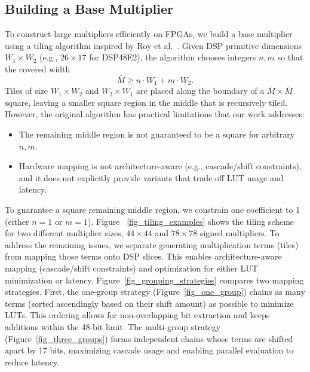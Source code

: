 \subsection{Building a Base Multiplier} \label{sec_build_base_mult}


To construct large multipliers efficiently on FPGAs, we build a base multiplier using a tiling algorithm inspired by Roy et al.~\cite{royTileMultiplicationEfficient2014}.
Given DSP primitive dimensions $W_1\times W_2$ (e.g., $26\times17$ for DSP48E2), the algorithm chooses integers $n,m$ so that the covered width
\[
\bar{M} \geq n \cdot  W_1  + m \cdot W_2 .
\]
Tiles of size $W_1\times W_2$ and $W_2\times W_1$ are placed along the boundary of a $\bar{M}\times\bar{M}$ square, leaving a smaller square region in the middle that is recursively tiled.
However, the original algorithm has practical limitations that our work addresses:
\begin{itemize}
    \item The remaining middle region is not guaranteed to be a square for arbitrary $n,m$.
    \item Hardware mapping is not architecture-aware (e.g., cascade/shift constraints), and it does not explicitly provide variants that trade off LUT usage and latency.
\end{itemize}

To guarantee a square remaining middle region, we constrain one coefficient to 1 (either $n=1$ or $m=1$).
Figure ~\ref{fig_tiling_examples} shows the tiling scheme for two different multiplier sizes, $44\times44$ and $78\times78$ signed multipliers.
To address the remaining issues, we separate generating multiplication terms (tiles) from mapping those terms onto DSP slices.
This enables architecture-aware mapping (cascade/shift constraints) and optimization for either LUT minimization or latency.
Figure~\ref{fig_grouping_strategies} compares two mapping strategies.
First, the one-group strategy (Figure~\ref{fig_one_group}) chains as many terms (sorted ascendingly based on their shift amount) as possible to minimize LUTs. 
This ordering allows for non-overlapping bit extraction and keeps additions within the 48-bit limit.
The multi-group strategy (Figure~\ref{fig_three_groups}) forms independent chains whose terms are shifted apart by 17 bits, maximizing cascade usage and enabling parallel evaluation to reduce latency.

